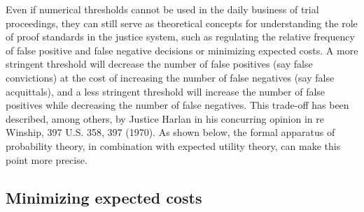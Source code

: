 \documentclass{article}
\begin{document}
Even if numerical thresholds cannot be used in the daily business of trial proceedings, they
can still serve as theoretical concepts for understanding the role of proof standards in the justice system, such as regulating the relative frequency of false positive and false negative decisions or minimizing expected costs.
A more stringent threshold will decrease the number of false positives (say false convictions) at the cost of increasing the number of false negatives (say false acquittals), and a less stringent threshold will increase the number of false positives while decreasing the number of false negatives.
This trade-off has been described, among others, by Justice Harlan in his concurring opinion in re Winship, 397 U.S. 358, 397 (1970).  
As shown below, the formal apparatus of probability theory, in combination with expected utility theory, can make this point more precise. 



\subsection{Minimizing expected costs}
\end{document}
